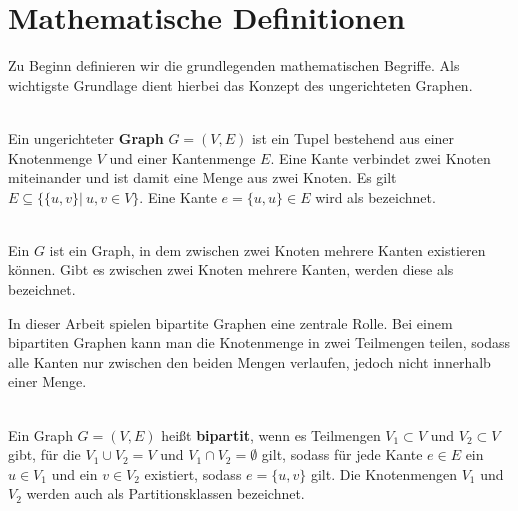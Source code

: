 


\section{Mathematische Definitionen}
Zu Beginn definieren wir die grundlegenden mathematischen Begriffe. Als wichtigste Grundlage dient 
hierbei das Konzept des ungerichteten Graphen.
\begin{definition}[Graph] ~\\
Ein ungerichteter \textbf{Graph} $G = (V,E)$ ist ein Tupel bestehend aus einer Knotenmenge $V$ und einer Kantenmenge
 $E$. Eine Kante verbindet zwei Knoten miteinander und ist damit eine Menge aus zwei Knoten.
 Es gilt $E \subseteq \{ \{u,v\} |\ u,v \in V\}$. Eine Kante $e = \{u,u\} \in E$ wird als 
 bezeichnet.
\end{definition}
\begin{definition}[Multigraph] ~\\
Ein  $G$ ist ein Graph, in dem zwischen zwei Knoten mehrere Kanten existieren 
können. Gibt es zwischen zwei Knoten mehrere Kanten, werden diese als  bezeichnet.
\end{definition}

In dieser Arbeit spielen bipartite Graphen eine zentrale Rolle.
Bei einem bipartiten Graphen kann man die Knotenmenge in zwei Teilmengen teilen, sodass alle Kanten nur zwischen den 
beiden Mengen verlaufen, jedoch nicht innerhalb einer Menge.
\begin{definition} ~\\
Ein Graph $G=(V,E)$ heißt \textbf{bipartit}, wenn es Teilmengen $V_1 \subset V$ und $V_2 \subset V$ gibt, für die 
$V_1 \cup V_2 = V$ und $V_1 \cap V_2 = \emptyset$ gilt,
 sodass für jede Kante $e \in E$ ein $u \in V_1$ und ein $v \in V_2$ existiert, sodass $e = \{u,v\}$ gilt.
Die Knotenmengen $V_1$ und $V_2$ werden auch als Partitionsklassen bezeichnet.
\end{definition}


